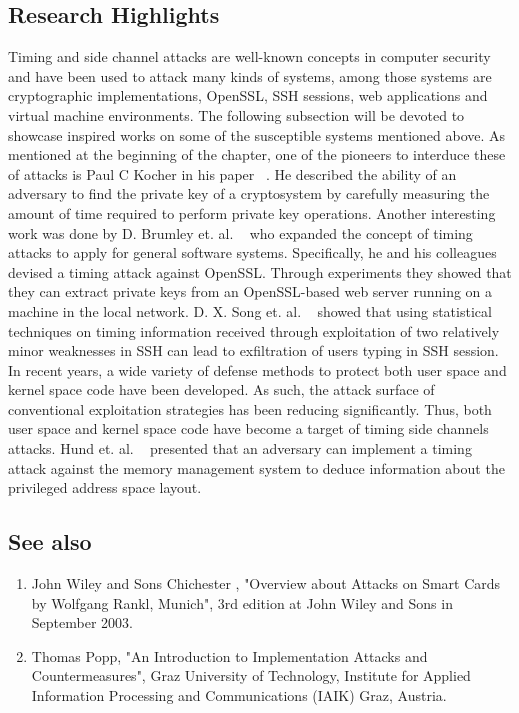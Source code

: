 \subsection{Research Highlights}
Timing and side channel attacks are well-known concepts in computer security and have
been used to attack many kinds of systems, among those systems are cryptographic 
implementations, OpenSSL, SSH sessions, web applications and virtual machine 
environments. The following subsection will be devoted to showcase inspired works 
on some of the susceptible systems mentioned above. As mentioned at the beginning
of the chapter, one of the pioneers to interduce these of attacks is Paul C Kocher 
in his paper ~\cite{kocher1996timing}. He described the ability of an adversary to 
find the private key of a cryptosystem by carefully measuring the amount of time required to perform 
private key operations. 
Another interesting work was done by D. Brumley et. al. ~\cite{brumley2005remote} who expanded
the concept of timing attacks to apply for general software systems. Specifically, 
he and his colleagues devised a timing attack against OpenSSL. 
Through experiments they showed that they can extract private keys from an 
OpenSSL-based web server running on a machine in the local network. 
D. X. Song et. al. ~\cite{song2001timing} showed that using statistical techniques on timing 
information received through exploitation of two relatively minor weaknesses in SSH 
can lead to exfiltration of users typing in SSH session. 
In recent years, a wide variety of defense methods to protect both user space and 
kernel space code have been developed. As such, the attack surface of conventional 
exploitation strategies has been reducing significantly.
Thus, both user space and kernel space code have become a target of timing side 
channels attacks. Hund et. al. ~\cite{hund2013practical} presented that an adversary can 
implement a timing attack against the memory management system to deduce information 
about the privileged address space layout.  

\subsection{See also}
\begin{enumerate}
    \item John Wiley and Sons Chichester , "Overview about Attacks on Smart
    Cards by Wolfgang Rankl, Munich", 3rd edition at John Wiley and Sons in
    September 2003.
    \item Thomas Popp, "An Introduction to Implementation Attacks and
    Countermeasures", Graz University of Technology, Institute for Applied
    Information Processing and Communications (IAIK) Graz, Austria.
\end{enumerate}